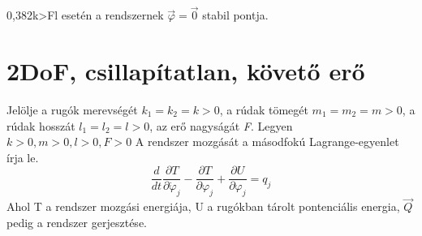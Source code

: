 \documentclass[12pt,twoside]{article}
\newcommand{\pd}[2]{\frac{\partial #1}{\partial #2}}
\begin{document}
0,382k>Fl esetén a rendszernek $\vec\varphi = \vec 0$ stabil pontja.


\section{2DoF, csillapítatlan, követő erő}%
 Jelölje a rugók merevségét $  k_1=k_2=k>0 $, a rúdak tömegét $  m_1=m_2=m>0 $, a rúdak hosszát $  l_1=l_2=l>0 $, az erő nagyságát \emph{F}. Legyen $  k>0, m>0, l>0, F>0 $ \newline
A rendszer mozgását a másodfokú Lagrange-egyenlet írja le.
\begin{equation} \label{eq:Newton}
\frac{d}{dt}\pd{T}{\dot\varphi_j}-\pd{T}{\varphi_j}+\pd{U}{\varphi_j}=q_j
\end{equation}
Ahol T a rendszer mozgási energiája, U a rugókban tárolt pontenciális energia, $\vec Q$ pedig a rendszer gerjesztése.
\end{document}
